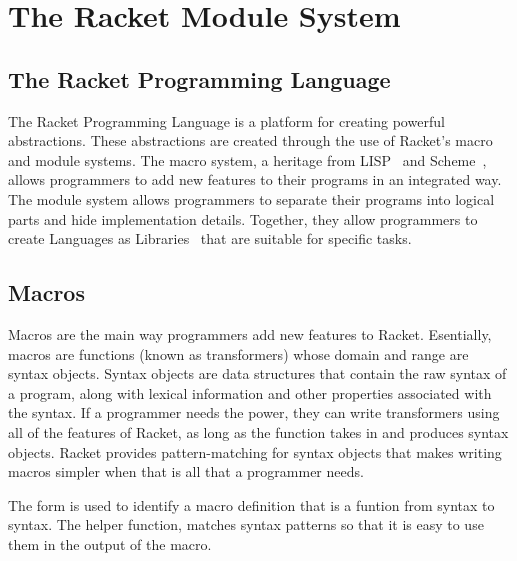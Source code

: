 \chapter{The Racket Module System}
\label{chap:module-system}

\section{The Racket Programming Language}
The Racket Programming Language is a platform for creating powerful abstractions.
These abstractions are created through the use of Racket's macro and module systems. 
The macro system, a heritage from LISP~\cite{LISP} and Scheme~\cite{scheme}, allows programmers to add new features to their programs in an integrated way.
The module system allows programmers to separate their programs into logical parts and hide implementation details. 
Together, they allow programmers to create Languages as Libraries~\cite{lal} that are suitable for specific tasks.

\section{Macros}
Macros are the main way programmers add new features to Racket. 
Esentially, macros are functions (known as transformers) whose domain and range are syntax objects.
Syntax objects are data structures that contain the raw syntax of a program, along with lexical information and other properties associated with the syntax.
If a programmer needs the power, they can write transformers using all of the features of Racket, as long as the function takes in and produces syntax objects.
Racket provides pattern-matching for syntax objects that makes writing macros simpler when that is all that a programmer needs.

The  form is used to identify a macro definition that is a funtion from syntax to syntax.
The helper function,  matches syntax patterns so that it is easy to use them in the output of the macro.

